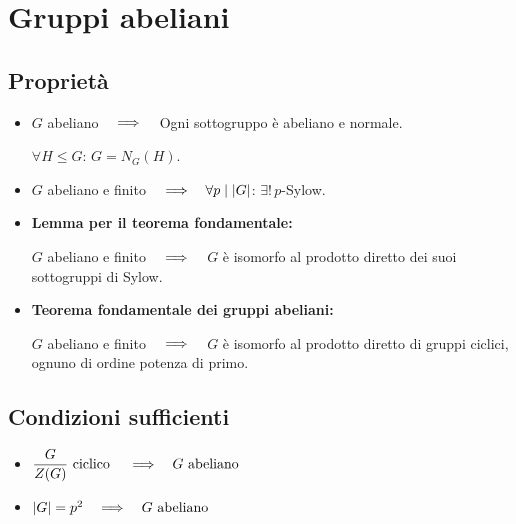 \chapter{Gruppi abeliani}
\label{ch:gruppi_abeliani}

\section{Proprietà}
\label{sec:gruppi_abeliani_proprieta}

\begin{itemize}
    \item $G$ abeliano $\quad\Longrightarrow\quad$ Ogni sottogruppo è abeliano e normale.

        $\forall H \le G$: $G = N_G(H)$.
    \item $G$ abeliano e finito $\quad\Longrightarrow\quad \forall p \mid \lvert G \rvert$: $\exists ! \, p$-Sylow.
    \item \textbf{Lemma per il teorema fondamentale:}

        $G$ abeliano e finito $\quad\Longrightarrow\quad$ $G$ è isomorfo al prodotto diretto dei suoi sottogruppi di Sylow.
    \item \textbf{Teorema fondamentale dei gruppi abeliani:}

        $G$ abeliano e finito $\quad\Longrightarrow\quad$ $G$ è isomorfo al prodotto diretto di gruppi ciclici, ognuno di ordine potenza di primo.
\end{itemize}

\section{Condizioni sufficienti}
\label{sec:gruppi_abeliani_condizioni_sufficienti}

\begin{itemize}
    \item $\dfrac{G}{Z(G)} \text{ ciclico } \quad\Longrightarrow\quad G \text{ abeliano }$
    \item $\lvert G \rvert = p^2 \quad\Longrightarrow\quad G \text{ abeliano }$
\end{itemize}